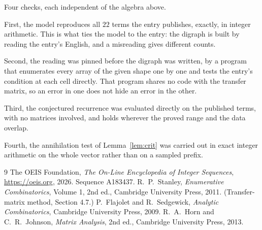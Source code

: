 \documentclass[11pt,a4paper]{article}
\theoremstyle{plain}
\theoremstyle{definition}
\begin{document}
Four checks, each independent of the algebra above.

First, the model reproduces all $22$ terms the entry publishes, exactly, in integer
arithmetic. This is what ties the model to the entry: the digraph is built by reading the
entry's English, and a misreading gives different counts.

Second, the reading was pinned before the digraph was written, by a program that enumerates
every array of the given shape one by one and tests the entry's condition at each cell
directly. That program shares no code with the transfer matrix, so an error in one does not
hide an error in the other.

Third, the conjectured recurrence was evaluated directly on the published terms, with no
matrices involved, and holds wherever the proved range and the data overlap.

Fourth, the annihilation test of Lemma~\ref{lem:crit} was carried out in exact integer
arithmetic on the whole vector rather than on a sampled prefix.

\begin{thebibliography}{9}
 The OEIS Foundation, \emph{The On-Line Encyclopedia of Integer
Sequences}, \url{https://oeis.org}, 2026. Sequence A183437.
 R.~P.~Stanley, \emph{Enumerative Combinatorics}, Volume 1, 2nd ed.,
Cambridge University Press, 2011. (Transfer-matrix method, Section 4.7.)
 P.~Flajolet and R.~Sedgewick, \emph{Analytic Combinatorics}, Cambridge
University Press, 2009.
 R.~A.~Horn and C.~R.~Johnson, \emph{Matrix Analysis}, 2nd ed., Cambridge
University Press, 2013.
\end{thebibliography}
\end{document}
